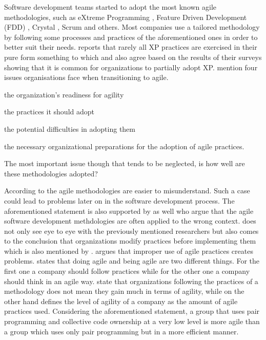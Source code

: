 Software development teams started to adopt the most known agile methodologies, such as eXtreme Programming \cite{Beck:2004:EPE:1076267}, Feature Driven Development (FDD) \cite{Palmer:2001:PGF:600044}, Crystal \cite{Cockburn:2004:CCH:1406822}, Scrum \cite{scrum} and others. Most companies use a tailored methodology by following some processes and practices of the aforementioned ones in order to better suit their needs. \citet{williams2004toward} reports that rarely all XP practices are exercised in their pure form something to which \citet{Reifer} and \cite{aveling} also agree based on the results of their surveys showing that it is common for organizations to partially adopt XP. \citet{sidky} mention four issues organisations face when transitioning to agile.
\begin{inparaenum} [a\upshape)]
\item the organization's readiness for agility
\item the practices it should adopt
\item the potential difficulties in adopting them
\item the necessary organizational preparations for the adoption of agile practices. 
\end{inparaenum}
The most important issue though that tends to be neglected, is how well are these methodologies adopted? 

According to \citet{6427226} the agile methodologies are easier to misunderstand. Such a case could lead to problems later on in the software development process. The aforementioned statement is also supported by \citet{cefam} as well who argue that the agile software development methdologies are often applied to the wrong context. \citet{1629340} does not only see eye to eye with the previously mentioned researchers but also comes to the conclusion that organizations modify practices before implementing them which is also mentioned by \citet{1579312}. \citet{hossain} argues that improper use of agile practices creates problems. \citet{sahota} states that doing agile and being agile are two different things. For the first one a company should follow practices while for the other one a company should think in an agile way. \citet{lappoA04} state that organizations following the practices of a methodology does not mean they gain much in terms of agility, while on the other hand \citet{sidky_dissertation} defines the level of agility of a company as the amount of agile practices used. Considering the aforementioned statement, a group that uses pair programming and collective code ownership at a very low level is more agile than a group which uses only pair programming but in a more efficient manner.

